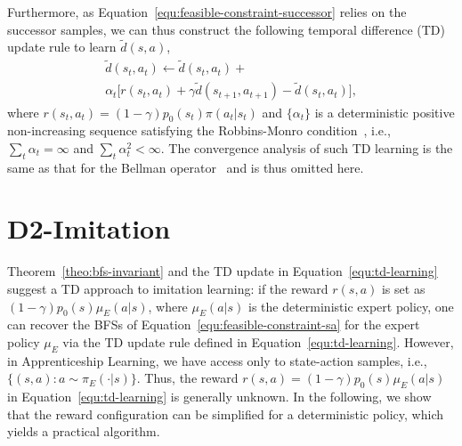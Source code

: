 \documentclass[letterpaper]{article} %
\begin{document}
Furthermore, as Equation~\eqref{equ:feasible-constraint-successor} relies on the successor samples,
we can thus construct the following temporal difference (TD) update rule to learn $\tilde{d}(s, a)$,
\begin{multline}\label{equ:td-learning}
\tilde{d}(s_t, a_t) \leftarrow \tilde{d}(s_t,a_t) + \\
\alpha_t \big[ r(s_t, a_t) + \gamma \tilde{d}(s_{t+1},a_{t+1}) - \tilde{d}(s_t, a_t) \big],
\end{multline}
where $r(s_t, a_t) = (1-\gamma) p_0(s_t)\pi(a_t|s_t)$
and $\{\alpha_t\}$ is a deterministic positive non-increasing sequence satisfying the Robbins-Monro condition~\cite{robbins1951stochastic},
i.e., $\sum_t\alpha_t = \infty$ and $\sum_t \alpha_t^2 < \infty$.
The convergence analysis of such TD learning is the same as that for the Bellman operator~\cite{yu2015convergence} and is thus omitted here.


\section{D2-Imitation}
Theorem~\ref{theo:bfs-invariant} and the TD update in Equation~\eqref{equ:td-learning} suggest a TD approach to imitation learning:
if the reward $r(s, a)$ is set as $(1-\gamma)p_0(s)\mu_E(a|s)$, where $\mu_E(a|s)$ is the deterministic expert policy,
one can recover the BFSs of Equation~\eqref{equ:feasible-constraint-sa} for the expert policy $\mu_E$ via the TD update rule defined in Equation~\eqref{equ:td-learning}.
However, in Apprenticeship Learning,
we have access only to state-action samples,
i.e., $\{(s, a): a\sim\pi_E(\cdot|s)\}$.
Thus, the reward $r(s, a) = (1-\gamma) p_0(s)\mu_E(a|s)$ in Equation~\eqref{equ:td-learning} is generally unknown.
In the following, we show that the reward configuration can be simplified for a deterministic policy, which yields a practical algorithm.
\end{document}
